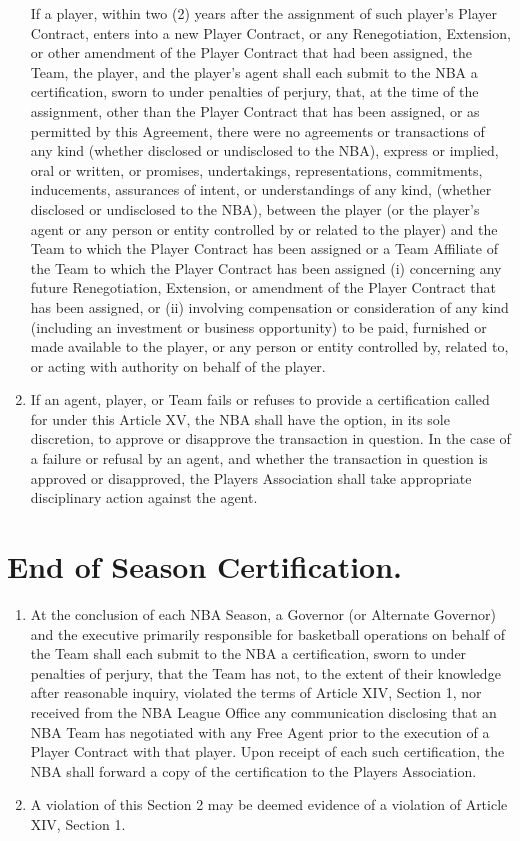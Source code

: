 \documentclass[
]{book}
\providecommand{\tightlist}{%
  \setlength{\itemsep}{0pt}\setlength{\parskip}{0pt}}
\begin{document}
\begin{enumerate}
  If a player, within two (2) years after the assignment of such player's Player Contract, enters into a new Player Contract, or any Renegotiation, Extension, or other amendment of the Player Contract that had been assigned, the Team, the player, and the player's agent shall each submit to the NBA a certification, sworn to under penalties of perjury, that, at the time of the assignment, other than the Player Contract that has been assigned, or as permitted by this Agreement, there were no agreements or transactions of any kind (whether disclosed or undisclosed to the NBA), express or implied, oral or written, or promises, undertakings, representations, commitments, inducements, assurances of intent, or understandings of any kind, (whether disclosed or undisclosed to the NBA), between the player (or the player's agent or any person or entity controlled by or related to the player) and the Team to which the Player Contract has been assigned or a Team Affiliate of the Team to which the Player Contract has been assigned (i) concerning any future Renegotiation, Extension, or amendment of the Player Contract that has been assigned, or (ii) involving compensation or consideration of any kind (including an investment or business opportunity) to be paid, furnished or made available to the player, or any person or entity controlled by, related to, or acting with authority on behalf of the player.
\item
  If an agent, player, or Team fails or refuses to provide a certification called for under this Article XV, the NBA shall have the option, in its sole discretion, to approve or disapprove the transaction in question. In the case of a failure or refusal by an agent, and whether the transaction in question is approved or disapproved, the Players Association shall take appropriate disciplinary action against the agent.
\end{enumerate}

\hypertarget{end-of-season-certification.}{%
\section{End of Season Certification.}\label{end-of-season-certification.}}

\begin{enumerate}
\def\labelenumi{(\alph{enumi})}
\tightlist
\item
  At the conclusion of each NBA Season, a Governor (or Alternate Governor) and the executive primarily responsible for basketball operations on behalf of the Team shall each submit to the NBA a certification, sworn to under penalties of perjury, that the Team has not, to the extent of their knowledge after reasonable inquiry, violated the terms of Article XIV, Section 1, nor received from the NBA League Office any communication disclosing that an NBA Team has negotiated with any Free Agent prior to the execution of a Player Contract with that player. Upon receipt of each such certification, the NBA shall forward a copy of the certification to the Players Association.
\item
  A violation of this Section 2 may be deemed evidence of a violation of Article XIV, Section 1.
\end{enumerate}
\end{document}
